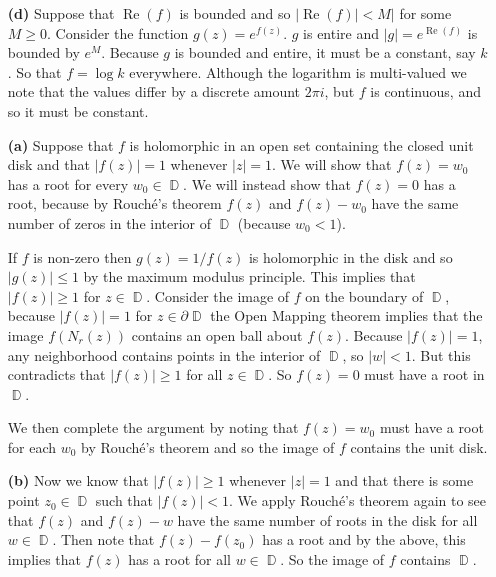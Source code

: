 \documentclass{article}
\DeclareMathOperator{\D}{\mathbb{D}}
\newcommand{\exercise}[1]{\noindent{\textbf{Exercise #1:}}}
\newcommand{\real}{\mathrel{\text{Re}}}
\begin{document}
\exercise{3.8.15}
\begin{enumerate}
\item[\textbf{(d)}] Suppose that $\real(f)$ is bounded and so
  $|\real(f)| < M|$ for some $M \geq 0$. Consider the function $g(z) =
  e^{f(z)}$. $g$ is entire and $|g| = e^{\real(f)}$ is bounded by
  $e^M$. Because $g$ is bounded and entire, it must be a constant, say
  $k$. So that $f = \log k$ everywhere. Although the logarithm is
  multi-valued we note that the values differ by a discrete amount
  $2\pi i$, but $f$ is continuous, and so it must be constant.
\end{enumerate}

\exercise{3.8.17}
\begin{enumerate}
\item[\textbf{(a)}] Suppose that $f$ is holomorphic in an open set
  containing the closed unit disk and that $|f(z)| = 1$ whenever $|z|
  = 1$. We will show that $f(z) = w_0$ has a root for every $w_0 \in
  \D$. We will instead show that $f(z) = 0$ has a root, because by
  Rouch\'{e}'s theorem $f(z)$ and $f(z) -w_0$ have the same number of
  zeros in the interior of $\D$ (because $w_0 < 1$).

  If $f$ is non-zero then $g(z) = 1/f(z)$ is holomorphic in the disk
  and so $|g(z)| \leq 1$ by the maximum modulus principle. This
  implies that $|f(z)| \geq 1$ for $z \in \D$. Consider the image of
  $f$ on the boundary of $\D$, because $|f(z)| = 1$ for $z
  \in \partial\D$ the Open Mapping theorem implies that the image
  $f(N_r(z))$ contains an open ball about $f(z)$. Because $|f(z)| =
  1$, any neighborhood contains points in the interior of $\D$, so
  $|w| < 1$. But this contradicts that $|f(z)| \geq 1$ for all $z \in
  \D$. So $f(z) = 0$ must have a root in $\D$.

  We then complete the argument by noting that $f(z) = w_0$ must have
  a root for each $w_0$ by Rouch\'{e}'s theorem and so the image of
  $f$ contains the unit disk.
\item[\textbf{(b)}] Now we know that $|f(z)| \geq 1$ whenever $|z| =
  1$ and that there is some point $z_0 \in \D$ such that $|f(z)| <
  1$. We apply Rouch\'{e}'s theorem again to see that $f(z)$ and $f(z)
  - w$ have the same number of roots in the disk for all $w \in
  \D$. Then note that $f(z) - f(z_0)$ has a root and by the above,
  this implies that $f(z)$ has a root for all $w \in \D$. So the image
  of $f$ contains $\D$.
\end{enumerate}
\end{document}
